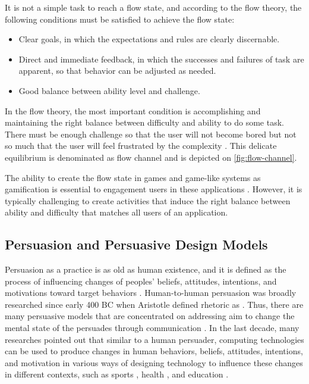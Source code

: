 It is not a simple task to reach a flow state, and according to the flow theory, the following conditions must be satisfied to achieve the flow state:

\begin{itemize}
\item Clear goals, in which the expectations and rules are clearly discernable.
\item Direct and immediate feedback, in which the successes and failures of task are apparent, so that behavior can be adjusted as needed.
\item Good balance between ability level and challenge.
\end{itemize}

In the flow theory, the most important condition is accomplishing and maintaining the right balance between difficulty and ability to do some task.
There must be enough challenge so that the user will not become bored but not so much that the user will feel frustrated by the complexity \cite{Csikszentmihalyi2008}.
This delicate equilibrium is denominated as flow channel and is depicted on \autoref{fig:flow-channel}.

The ability to create the flow state in games and game-like systems as gamification is essential to engagement users in these applications \cite{Xu2011}.
However, it is typically challenging to create activities that induce the right balance between ability and difficulty that matches all users of an application.


\subsection{Persuasion and Persuasive Design Models}
\label{subsec:persuasive-theories-persuasive-design-models}

Persuasion as a practice is as old as human existence, and it is defined as the process of influencing changes of peoples' beliefs, attitudes, intentions, and motivations toward target behaviors \cite{SeiterGass2004}.
Human-to-human persuasion was broadly researched since early 400 BC when Aristotle defined rhetoric as  \cite{Natanson1955}.
Thus, there are many persuasive models that are concentrated on addressing aim to change the mental state of the persuades through communication \cite{GueriniStockZancanaro2007}.
In the last decade, many researches pointed out that similar to a human persuader, computing technologies can be used to produce changes in human behaviors, beliefs, attitudes, intentions, and motivation in various ways of designing technology to influence these changes in different contexts, such as sports \cite{HarjumaaSegerstaahlOinas-Kukkonen2009}, health \cite{OrjiVassilevaMandryk2014}, and education \cite{LuceroZuloagaMotaMunoz2006, GohSeetChen2011}.

